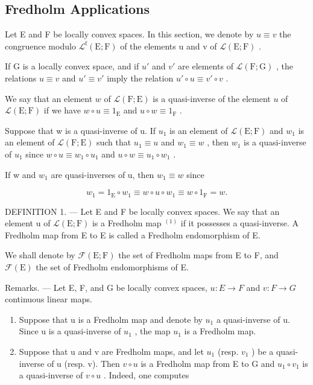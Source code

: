 \subsection{Fredholm Applications}

Let E and F be locally convex spaces. In this section, we denote by \(u \equiv v\) the congruence modulo \(\mathcal{L}^{\mathrm{f}}(\mathrm{E};\mathrm{F})\) of the elements u and v of \(\mathcal{L}(\mathrm{E};\mathrm{F})\) .

If G is a locally convex space, and if \(u'\) and \(v'\) are elements of \(\mathcal{L}(\mathrm{F};\mathrm{G})\) , the relations \(u \equiv v\) and \(u' \equiv v'\) imply the relation \(u' \circ u \equiv v' \circ v\) .

We say that an element \(w\) of \(\mathcal{L}(\mathrm{F};\mathrm{E})\) is a quasi-inverse of the element \(u\) of \(\mathcal{L}(\mathrm{E};\mathrm{F})\) if we have \(w \circ u \equiv 1_{\mathrm{E}}\) and \(u \circ w \equiv 1_{\mathrm{F}}\) .

Suppose that w is a quasi-inverse of u. If \(u_{1}\) is an element of \(\mathcal{L}(\mathrm{E};\mathrm{F})\) and \(w_{1}\) is an element of \(\mathcal{L}(\mathrm{F};\mathrm{E})\) such that \(u_{1} \equiv u\) and \(w_{1} \equiv w\) , then \(w_{1}\) is a quasi-inverse of \(u_{1}\) since \(w \circ u \equiv w_{1} \circ u_{1}\) and \(u \circ w \equiv u_{1} \circ w_{1}\) .

If w and \(w_{1}\) are quasi-inverses of u, then \(w_{1} \equiv w\) since

\[
w _ {1} = 1 _ {\mathrm{E}} \circ w _ {1} \equiv w \circ u \circ w _ {1} \equiv w \circ 1 _ {\mathrm{F}} = w.
\]

DEFINITION 1. --- Let E and F be locally convex spaces. We say that an element u of \(\mathcal{L}(\mathrm{E};\mathrm{F})\) is a Fredholm map \(^{(1)}\) if it possesses a quasi-inverse. A Fredholm map from E to E is called a Fredholm endomorphism of E.

We shall denote by \(\mathcal{F}(\mathrm{E};\mathrm{F})\) the set of Fredholm maps from E to F, and \(\mathcal{F}(\mathrm{E})\) the set of Fredholm endomorphisms of E.

Remarks. --- Let E, F, and G be locally convex spaces, \(u: E \to F\) and \(v: F \to G\) continuous linear maps.

\begin{enumerate}
\def\labelenumi{\arabic{enumi})}
\item
  Suppose that u is a Fredholm map and denote by \(u_{1}\) a quasi-inverse of u. Since u is a quasi-inverse of \(u_{1}\) , the map \(u_{1}\) is a Fredholm map.
\item
  Suppose that u and v are Fredholm maps, and let \(u_{1}\) (resp. \(v_{1}\) ) be a quasi-inverse of u (resp. v). Then \(v \circ u\) is a Fredholm map from E to G and \(u_{1} \circ v_{1}\) is a quasi-inverse of \(v \circ u\) . Indeed, one computes
\end{enumerate}

